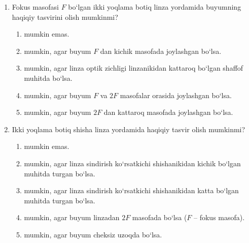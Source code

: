 \begin{enumerate}
\item Fokus masofasi $F$ bo‘lgan ikki yoqlama botiq linza yordamida buyumning haqiqiy tasvirini olish mumkinmi?
\begin{enumerate}[label=\Alph*)]
\item mumkin emas.
\item mumkin, agar buyum $F$ dan kichik masofada joylashgan bo‘lsa.
\item mumkin, agar linza optik zichligi linzanikidan kattaroq bo‘lgan shaffof muhitda bo‘lsa.
\item mumkin, agar buyum $F$ va $2F$ masofalar orasida joylashgan bo‘lsa.
\item mumkin, agar buyum $2F$ dan kattaroq masofada joylashgan bo‘lsa.
\end{enumerate}

\item Ikki yoqlama botiq shisha linza yordamida haqiqiy tasvir olish mumkinmi?
\begin{enumerate}[label=\Alph*)]
\item mumkin emas.
\item mumkin, agar linza sindirish ko‘rsatkichi shishanikidan kichik bo‘lgan muhitda turgan bo‘lsa.
\item mumkin, agar linza sindirish ko‘rsatkichi shishanikidan katta bo‘lgan muhitda turgan bo‘lsa.
\item mumkin, agar buyum linzadan $2F$ masofada bo‘lsa ($F$ – fokus masofa).
\item mumkin, agar buyum cheksiz uzoqda bo‘lsa.
\end{enumerate}

\end{enumerate}

\vspace{1em}

